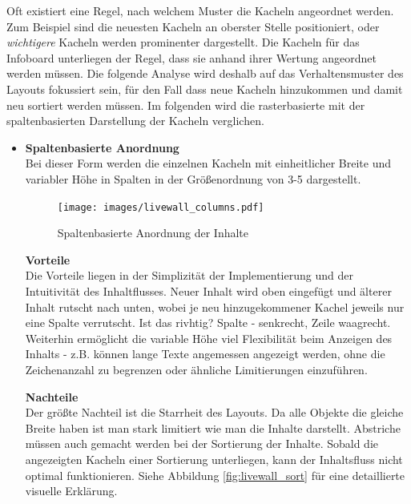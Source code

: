 \documentclass[12pt,twoside]{book}
\begin{document}
Oft existiert eine Regel, nach welchem Muster die Kacheln angeordnet werden. Zum Beispiel sind die neuesten Kacheln an oberster Stelle positioniert,  oder \textit{wichtigere} Kacheln werden prominenter dargestellt.  Die Kacheln für das Infoboard unterliegen der Regel, dass sie anhand ihrer Wertung angeordnet werden müssen. Die folgende Analyse wird deshalb auf das Verhaltensmuster des Layouts fokussiert sein, für den Fall dass neue Kacheln hinzukommen und damit neu sortiert werden müssen.
Im folgenden wird die rasterbasierte mit der spaltenbasierten Darstellung der Kacheln verglichen.

\begin{itemize}
  \item \textbf{Spaltenbasierte Anordnung} \\
  Bei dieser Form werden die einzelnen Kacheln mit einheitlicher Breite und variabler Höhe in Spalten in der Größenordnung von 3-5 dargestellt.

  \begin{figure}[htbp]
    \centering
    \texttt{[image: images/livewall\_columns.pdf]}
    \caption{Spaltenbasierte Anordnung der Inhalte}
    \label{fig:awesome_image}
  \end{figure}

  \textbf{Vorteile} \\
  Die Vorteile liegen in der Simplizität der Implementierung und der Intuitivität des Inhaltflusses. Neuer Inhalt wird oben eingefügt und älterer Inhalt rutscht nach unten, wobei je neu hinzugekommener Kachel jeweils nur eine Spalte verrutscht. Ist das rivhtig? Spalte - senkrecht, Zeile waagrecht.
  Weiterhin ermöglicht die variable Höhe viel Flexibilität beim Anzeigen des Inhalts - z.B. können lange Texte angemessen angezeigt werden, ohne die Zeichenanzahl zu begrenzen oder ähnliche Limitierungen einzuführen.

  \textbf{Nachteile}\\
  Der größte Nachteil ist die Starrheit des Layouts. Da alle Objekte die gleiche Breite haben ist man stark limitiert wie man die Inhalte darstellt. Abstriche müssen auch gemacht werden bei der Sortierung der Inhalte. Sobald die angezeigten Kacheln einer Sortierung unterliegen, kann der Inhaltsfluss nicht optimal funktionieren. Siehe Abbildung \ref{fig:livewall_sort} für eine detaillierte visuelle Erklärung.


\end{itemize}
\end{document}

